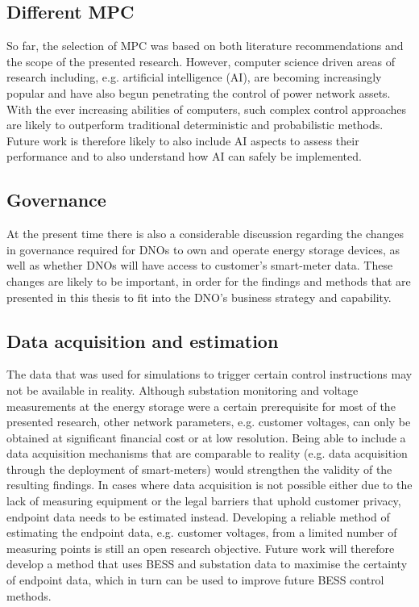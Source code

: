 \subsection{Different MPC}

So far, the selection of MPC was based on both literature recommendations and the scope of the presented research.
However, computer science driven areas of research including, e.g. artificial intelligence (AI), are becoming increasingly popular and have also begun penetrating the control of power network assets.
With the ever increasing abilities of computers, such complex control approaches are likely to outperform traditional deterministic and probabilistic methods.
Future work is therefore likely to also include AI aspects to assess their performance and to also understand how AI can safely be implemented.

\subsection{Governance}

At the present time there is also a considerable discussion regarding the changes in governance required for DNOs to own and operate energy storage devices, as well as whether DNOs will have access to customer's smart-meter data.
These changes are likely to be important, in order for the findings and methods that are presented in this thesis to fit into the DNO's business strategy and capability.

\subsection{Data acquisition and estimation}

The data that was used for simulations to trigger certain control instructions may not be available in reality.
Although substation monitoring and voltage measurements at the energy storage were a certain prerequisite for most of the presented research, other network parameters, e.g. customer voltages, can only be obtained at significant financial cost or at low resolution.
Being able to include a data acquisition mechanisms that are comparable to reality (e.g. data acquisition through the deployment of smart-meters) would strengthen the validity of the resulting findings.
In cases where data acquisition is not possible either due to the lack of measuring equipment or the legal barriers that uphold customer privacy, endpoint data needs to be estimated instead.
Developing a reliable method of estimating the endpoint data, e.g. customer voltages, from a limited number of measuring points is still an open research objective.
Future work will therefore develop a method that uses BESS and substation data to maximise the certainty of endpoint data, which in turn can be used to improve future BESS control methods.







